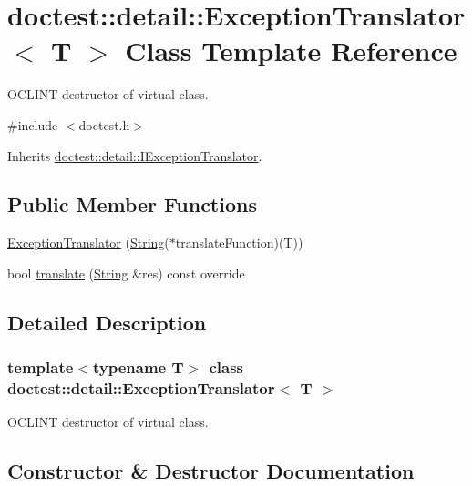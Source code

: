 \hypertarget{classdoctest_1_1detail_1_1_exception_translator}{}\section{doctest\+:\+:detail\+:\+:Exception\+Translator$<$ T $>$ Class Template Reference}
\label{classdoctest_1_1detail_1_1_exception_translator}


O\+C\+L\+I\+NT destructor of virtual class.  




{\ttfamily \#include $<$doctest.\+h$>$}



Inherits \mbox{\hyperlink{structdoctest_1_1detail_1_1_i_exception_translator}{doctest\+::detail\+::\+I\+Exception\+Translator}}.

\subsection*{Public Member Functions}
\begin{DoxyCompactItemize}
\item 
\mbox{\hyperlink{classdoctest_1_1detail_1_1_exception_translator_a3ac05488993c40c6ba55ce51a6bf7eae}{Exception\+Translator}} (\mbox{\hyperlink{classdoctest_1_1_string}{String}}($\ast$translate\+Function)(T))
\item 
bool \mbox{\hyperlink{classdoctest_1_1detail_1_1_exception_translator_a56484c4218a06bbbd1548335a8b64110}{translate}} (\mbox{\hyperlink{classdoctest_1_1_string}{String}} \&res) const override
\end{DoxyCompactItemize}


\subsection{Detailed Description}
\subsubsection*{template$<$typename T$>$\newline
class doctest\+::detail\+::\+Exception\+Translator$<$ T $>$}

O\+C\+L\+I\+NT destructor of virtual class. 

\subsection{Constructor \& Destructor Documentation}
\mbox{\label{classdoctest_1_1detail_1_1_exception_translator_a3ac05488993c40c6ba55ce51a6bf7eae}} 
